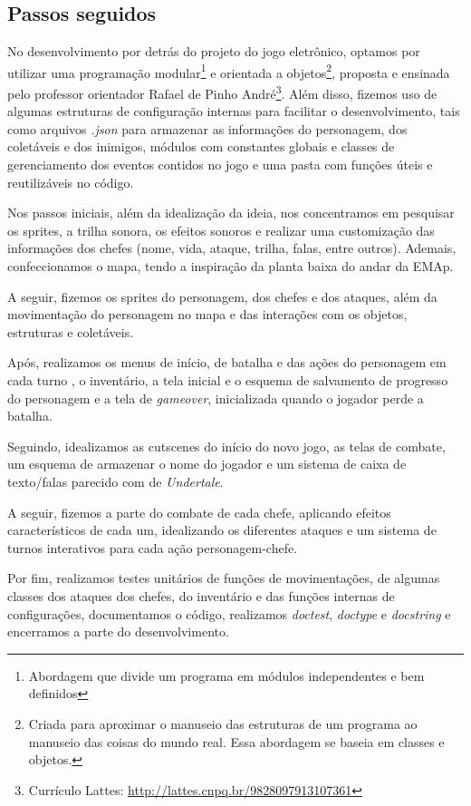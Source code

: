 \documentclass[a4paper, 12pt, twoside]{article}
\begin{document}
\subsection{Passos seguidos}
No desenvolvimento por detrás do projeto do jogo eletrônico, optamos por utilizar uma programação modular\footnote{Abordagem que divide um programa em módulos independentes e bem definidos} e orientada a objetos\footnote{Criada para aproximar o manuseio das estruturas de um programa ao manuseio das coisas do mundo real. Essa abordagem se baseia em classes e objetos.}, proposta e ensinada pelo professor orientador Rafael de Pinho André\footnote{Currículo Lattes: \url{http://lattes.cnpq.br/9828097913107361}}. Além disso, fizemos uso de algumas estruturas de configuração internas para facilitar o desenvolvimento, tais como arquivos \textit{.json} para armazenar as informações do personagem, dos coletáveis e dos inimigos, módulos com constantes globais e classes de gerenciamento dos eventos contidos no jogo e uma pasta com funções úteis e reutilizáveis no código.

Nos passos iniciais, além da idealização da ideia, nos concentramos em pesquisar os sprites, a trilha sonora, os efeitos sonoros e realizar uma customização das informações dos chefes (nome, vida, ataque, trilha, falas, entre outros). Ademais, confeccionamos o mapa, tendo a inspiração da planta baixa do andar da EMAp.

A seguir, fizemos os sprites do personagem, dos chefes e dos ataques, além da movimentação do personagem no mapa e das interações com os objetos, estruturas e coletáveis.

Após, realizamos os menus de início, de batalha e das ações do personagem em cada turno , o inventário, a tela inicial e o esquema de salvamento de progresso do personagem e a tela de \textit{gameover}, inicializada quando o jogador perde a batalha.

Seguindo, idealizamos as cutscenes do início do novo jogo, as telas de combate, um esquema de armazenar o nome do jogador e um sistema de caixa de texto/falas parecido com de \textit{Undertale}.

A seguir, fizemos a parte do combate de cada chefe, aplicando efeitos característicos de cada um, idealizando os diferentes ataques e um sistema de turnos interativos para cada ação personagem-chefe.

Por fim, realizamos testes unitários de funções de movimentações, de algumas classes dos ataques dos chefes, do inventário e das funções internas de configurações, documentamos o código, realizamos \textit{doctest}, \textit{doctype} e \textit{docstring} e encerramos a parte do desenvolvimento.
\end{document}
